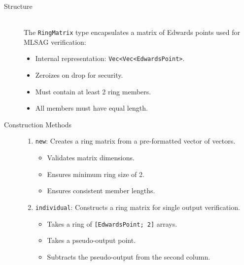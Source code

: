 \documentclass[12pt,a4paper]{article}
\begin{document}
\begin{description}
\item[Structure] \hfill \\
The \texttt{RingMatrix} type encapsulates a matrix of Edwards points used for MLSAG verification:
\begin{itemize}
\item Internal representation: \texttt{Vec<Vec<EdwardsPoint>}.
\item Zeroizes on drop for security.
\item Must contain at least 2 ring members.
\item All members must have equal length.
\end{itemize}

\item[Construction Methods] \hfill
\begin{enumerate}
\item \texttt{new}: Creates a ring matrix from a pre-formatted vector of vectors.
  \begin{itemize}
  \item Validates matrix dimensions.
  \item Ensures minimum ring size of 2.
  \item Ensures consistent member lengths.
  \end{itemize}

\item \texttt{individual}: Constructs a ring matrix for single output verification.
  \begin{itemize}
  \item Takes a ring of \texttt{[EdwardsPoint; 2]} arrays.
  \item Takes a pseudo-output point.
  \item Subtracts the pseudo-output from the second column.
  \end{itemize}
\end{enumerate}


\end{description}
\end{document}
